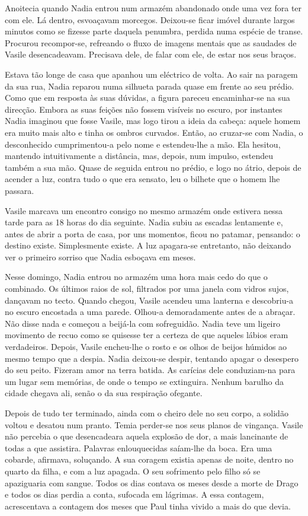Anoitecia quando Nadia entrou num armazém abandonado onde uma vez fora
ter com ele. Lá dentro, esvoaçavam morcegos. Deixou-se ficar imóvel
durante largos minutos como se fizesse parte daquela penumbra, perdida
numa espécie de transe. Procurou recompor-se, refreando o fluxo de
imagens mentais que as saudades de Vasile desencadeavam. Precisava dele,
de falar com ele, de estar nos seus braços.

Estava tão longe de casa que apanhou um eléctrico de volta. Ao sair na
paragem da sua rua, Nadia reparou numa silhueta parada quase em frente
ao seu prédio. Como que em resposta às suas dúvidas, a figura pareceu
encaminhar-se na sua direcção. Embora as suas feições não fossem
visíveis no escuro, por instantes Nadia imaginou que fosse Vasile, mas
logo tirou a ideia da cabeça: aquele homem era muito mais alto e tinha
os ombros curvados. Então, ao cruzar-se com Nadia, o desconhecido
cumprimentou-a pelo nome e estendeu-lhe a mão. Ela hesitou, mantendo
intuitivamente a distância, mas, depois, num impulso, estendeu também a
sua mão. Quase de seguida entrou no prédio, e logo no átrio, depois de
acender a luz, contra tudo o que era sensato, leu o bilhete que o
homem lhe passara.

Vasile marcava um encontro consigo no mesmo armazém onde estivera nessa tarde para as 18 horas do dia seguinte. Nadia
subiu as escadas lentamente e, antes de abrir a porta de casa, por uns
momentos, ficou no patamar, pensando: o destino existe. Simplesmente
existe. A luz apagara-se entretanto, não deixando ver o primeiro sorriso
que Nadia esboçava em meses.

Nesse domingo, Nadia entrou no armazém uma hora mais cedo do que o
combinado. Os últimos raios de sol, filtrados por uma janela com vidros
sujos, dançavam no tecto. Quando chegou, Vasile acendeu uma lanterna e
descobriu-a no escuro encostada a uma parede. Olhou-a demoradamente
antes de a abraçar. Não disse nada e começou a beijá-la com sofreguidão.
Nadia teve um ligeiro movimento de recuo como se quisesse ter a certeza
de que aqueles lábios eram verdadeiros. Depois, Vasile encheu-lhe o
rosto e os olhos de beijos húmidos ao mesmo tempo que a despia. Nadia
deixou-se despir, tentando apagar o desespero do seu peito. Fizeram
amor na terra batida. As carícias dele conduziam-na para um lugar sem
memórias, de onde o tempo se extinguira. Nenhum barulho da cidade
chegava ali, senão o da sua respiração ofegante.

Depois de tudo ter terminado, ainda com o cheiro dele
no seu corpo, a solidão voltou e desatou num pranto. Temia perder-se nos
seus planos de vingança. Vasile não percebia o que desencadeara aquela
explosão de dor, a mais lancinante de todas a que assistira. Palavras
enlouquecidas saíam-lhe da boca. Era uma cobarde, afirmava, soluçando.
A sua coragem existia apenas de noite, dentro no quarto da filha, e com
a luz apagada. O seu sofrimento pelo filho só se apaziguaria com sangue.
Todos os dias contava os meses desde a morte de Drago e todos os dias
perdia a conta, sufocada em lágrimas. A essa contagem, acrescentava a
contagem dos meses que Paul tinha vivido a mais do que devia.


